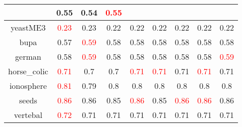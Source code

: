 \documentclass{article}%
\begin{document}
\begin{tabular}{c|cccccccc}
{}&0.55&0.54&\textcolor{red}{ 
0.55
}\\%
\hline%
yeastME3&\textcolor{red}{ 
0.23
}&0.23&0.22&0.22&0.22&0.22&0.22&0.22\\%
\hline%
bupa&0.57&\textcolor{red}{ 
0.59
}&0.58&0.58&0.58&0.58&0.58&0.58\\%
\hline%
german&0.58&\textcolor{red}{ 
0.59
}&0.58&0.58&0.58&0.58&0.58&\textcolor{red}{ 
0.59
}\\%
\hline%
horse\_colic&\textcolor{red}{ 
0.71
}&0.7&0.7&\textcolor{red}{ 
0.71
}&\textcolor{red}{ 
0.71
}&0.71&\textcolor{red}{ 
0.71
}&0.71\\%
\hline%
ionosphere&\textcolor{red}{ 
0.81
}&0.79&0.8&0.8&0.8&0.8&0.8&0.8\\%
\hline%
seeds&\textcolor{red}{ 
0.86
}&0.86&0.85&\textcolor{red}{ 
0.86
}&0.85&\textcolor{red}{ 
0.86
}&\textcolor{red}{ 
0.86
}&0.86\\%
\hline%
vertebal&\textcolor{red}{ 
0.72
}&0.71&0.71&0.71&0.71&0.71&0.71&0.71\\%
\hline%
\end{tabular}

%
\end{document}
